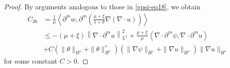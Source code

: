 \documentclass[reqno,11pt]{amsart}
\numberwithin{equation}{section}
\begin{document}
\begin{proof}
By arguments analogous to those in \eqref{gpsi-eq18}, we obtain
\begin{equation}\label{gpsi-eq20}
\begin{aligned}
C_{26}&=\frac{1}{\mu} \left\langle \partial^m w, \partial^m \left( \frac{\mu+\xi}{1+\theta} \nabla (\nabla \cdot u) \right) \right\rangle \\&
\leq -\left( \mu+\xi \right) \left\| \nabla \cdot \partial^m u \right\|_{L^2}^2 + \frac{\mu+\xi}{\mu} \left\langle \nabla \cdot \partial^m \psi, \nabla \cdot \partial^m u \right\rangle  \\&
+  C\left( \| \theta \|_{H^s} + \| \theta \|_{H^s}^s \right) \left( \| \nabla \psi \|_{H^s} + \| \nabla u \|_{H^s} \right) \| \nabla u \|_{H^s}  
\end{aligned}
\end{equation}
for some constant $C > 0$.


\end{proof}
\end{document}
